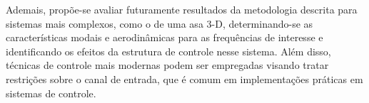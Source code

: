Ademais, propõe-se avaliar futuramente resultados da metodologia descrita para sistemas mais complexos, como o de uma asa 3-D, determinando-se as características modais e aerodinâmicas para as frequências de interesse e identificando os efeitos da estrutura de controle nesse sistema. Além disso, técnicas de controle mais modernas podem ser empregadas visando tratar restrições sobre o canal de entrada, que é comum em implementações práticas em sistemas de controle.

